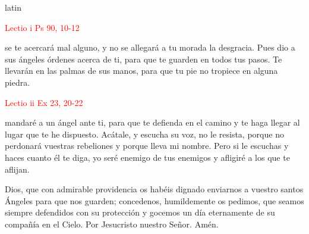 \begin{otherlanguage*}{latin}
    
\end{otherlanguage*}

\vspace{2mm}

\noindent\textcolor{red}{Lectio i \hfill Ps 90, 10-12}

se te acercará mal alguno, y no se allegará a tu morada la desgracia. Pues dio a sus ángeles órdenes acerca de ti, para que te guarden en todos tus pasos.
Te llevarán en las palmas de sus manos, para que tu pie no tropiece en alguna piedra.

\vspace{2mm}

\noindent\textcolor{red}{Lectio ii \hfill Ex 23, 20-22}

mandaré a un ángel ante ti, para que te defienda en el camino y te haga llegar al lugar que te he dispuesto. Acátale, y escucha su voz,
no le resista, porque no perdonará vuestras rebeliones y porque lleva mi nombre. Pero si le escuchas y haces cuanto él te diga, yo seré
enemigo de tus enemigos y afligiré a los que te aflijan.

\vspace{2mm}


\vspace{2mm}

\begin{otherlanguage}{latin}
    

    \vspace{1mm}

    

    \vspace{1mm}

    
\end{otherlanguage}

\vspace{2mm}

Dios, que con admirable providencia os habéis dignado enviarnos a vuestro santos Ángeles para que nos guarden; concedenos, humildemente os pedimos,
que seamos siempre defendidos con su protección y gocemos un día eternamente de su compañía en el Cielo. Por Jesucristo nuestro Señor. Amén.